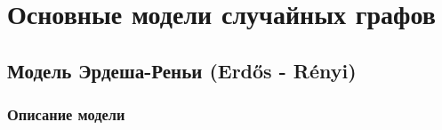 \documentclass[t]{beamer}
\begin{document}
    
    \frame{\titlepage}
    
    \section{Основные модели случайных графов}
    \subsection{Модель Эрдеша-Реньи (Erdős - Rényi)}  
    \subsubsection{Описание модели}	
    
        
    \begin{frame}
       
    \end{frame}	
    
    
    
\end{document}
